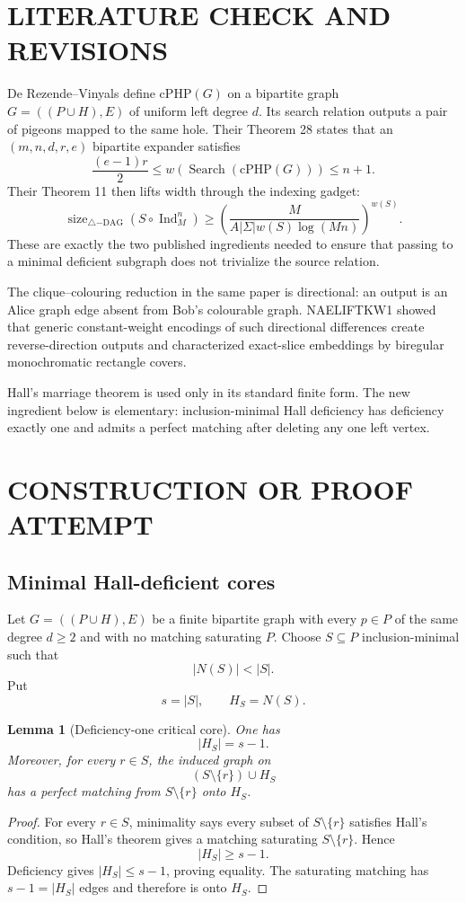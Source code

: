 \documentclass[11pt]{article}
\newtheorem{lemma}[theorem]{Lemma}
\begin{document}
\section{LITERATURE CHECK AND REVISIONS}
De Rezende--Vinyals define $\mathrm{cPHP}(G)$ on a bipartite graph $G=((P\cup H),E)$ of uniform left degree $d$. Its search relation outputs a pair of pigeons mapped to the same hole. Their Theorem 28 states that an $(m,n,d,r,e)$ bipartite expander satisfies
\[
\frac{(e-1)r}{2}
\le
w(\operatorname{Search}(\mathrm{cPHP}(G)))
\le n+1.
\]
Their Theorem 11 then lifts width through the indexing gadget:
\[
\operatorname{size}_{\triangle\mathrm{-DAG}}
(S\circ\operatorname{Ind}_M^n)
\ge
\left(
\frac{M}{A|\Sigma|w(S)\log(Mn)}
\right)^{w(S)}.
\]
These are exactly the two published ingredients needed to ensure that passing to a minimal deficient subgraph does not trivialize the source relation.

The clique--colouring reduction in the same paper is directional: an output is an Alice graph edge absent from Bob's colourable graph. NAELIFTKW1 showed that generic constant-weight encodings of such directional differences create reverse-direction outputs and characterized exact-slice embeddings by biregular monochromatic rectangle covers.

Hall's marriage theorem is used only in its standard finite form. The new ingredient below is elementary: inclusion-minimal Hall deficiency has deficiency exactly one and admits a perfect matching after deleting any one left vertex.

\section{CONSTRUCTION OR PROOF ATTEMPT}
\subsection{Minimal Hall-deficient cores}
Let $G=((P\cup H),E)$ be a finite bipartite graph with every $p\in P$ of the same degree $d\ge2$ and with no matching saturating $P$. Choose $S\subseteq P$ inclusion-minimal such that
\[
|N(S)|<|S|.
\]
Put
\[
s=|S|,\qquad H_S=N(S).
\]

\begin{lemma}[Deficiency-one critical core]
One has
\[
\boxed{|H_S|=s-1.}
\]
Moreover, for every $r\in S$, the induced graph on
\[
(S\setminus\{r\})\cup H_S
\]
has a perfect matching from $S\setminus\{r\}$ onto $H_S$.
\end{lemma}
\begin{proof}
For every $r\in S$, minimality says every subset of $S\setminus\{r\}$ satisfies Hall's condition, so Hall's theorem gives a matching saturating $S\setminus\{r\}$. Hence
\[
|H_S|\ge s-1.
\]
Deficiency gives $|H_S|\le s-1$, proving equality. The saturating matching has $s-1=|H_S|$ edges and therefore is onto $H_S$.
\end{proof}
\end{document}
